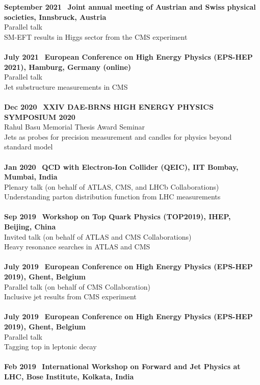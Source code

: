 \documentclass[a4paper,11pt]{article}
\begin{document}
{\textbf{September 2021} \ \textbf{Joint annual meeting of Austrian and Swiss physical societies, Innsbruck, Austria} \\
Parallel talk \\
SM-EFT results in Higgs sector from the CMS experiment\\
\\
\textbf{July 2021} \ \textbf{European Conference on High Energy Physics (EPS-HEP 2021), Hamburg, Germany (online)} \\
Parallel talk \\
Jet substructure measurements in CMS\\
\\
\textbf{Dec 2020} \ \textbf{XXIV DAE-BRNS HIGH ENERGY PHYSICS SYMPOSIUM 2020} \\
Rahul Basu Memorial Thesis Award Seminar \\
Jets as probes for precision measurement and candles for physics beyond standard model\\
\\
\textbf{Jan 2020} \ \textbf{QCD with Electron-Ion Collider (QEIC), IIT Bombay, Mumbai, India} \\
Plenary talk (on behalf of ATLAS, CMS, and LHCb Collaborations) \\
Understanding parton distribution function from LHC measurements\\
\\
\textbf{Sep 2019} \ \textbf{Workshop on Top Quark Physics (TOP2019), IHEP, Beijing, China} \\
Invited talk (on behalf of ATLAS and CMS Collaborations) \\
Heavy resonance searches in ATLAS and CMS \\
\\
\textbf{July 2019} \ \textbf{European Conference on High Energy Physics (EPS-HEP 2019), Ghent, Belgium} \\
Parallel talk (on behalf of CMS Collaboration) \\
Inclusive jet results from CMS experiment  \\
\\
\textbf{July 2019} \ \textbf{European Conference on High Energy Physics (EPS-HEP 2019), Ghent, Belgium} \\
Parallel talk \\
Tagging top in leptonic decay \\
\\
\textbf{Feb 2019} \ \textbf{International Workshop on Forward and Jet Physics at LHC, Bose Institute, Kolkata, India} \\
}
\end{document}
